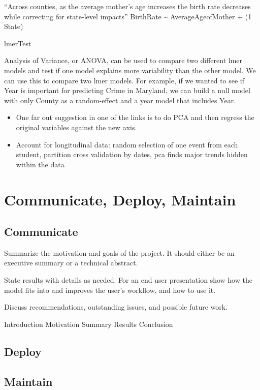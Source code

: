 \documentclass[]{book}
\begin{document}
``Across counties, as the average mother's age increases the birth rate
decreases while correcting for state-level impacts'' BirthRate
\textasciitilde{} AverageAgeofMother + (1 \textbar{} State)

lmerTest

Analysis of Variance, or ANOVA, can be used to compare two different
lmer models and test if one model explains more variability than the
other model. We can use this to compare two lmer models. For example, if
we wanted to see if Year is important for predicting Crime in Maryland,
we can build a null model with only County as a random-effect and a year
model that includes Year.

\begin{itemize}
\item
  One far out suggestion in one of the links is to do PCA and then
  regress the original variables against the new axis.
\item
  Account for longitudinal data: random selection of one event from each
  student, partition cross validation by dates, pca finds major trends
  hidden within the data
\end{itemize}

\chapter{Communicate, Deploy,
Maintain}\label{communicate-deploy-maintain}

\section{Communicate}\label{communicate-1}

Summarize the motivation and goals of the project. It should either be
an executive summary or a technical abstract.

State results with details as needed. For an end user presentation show
how the model fits into and improves the user's workflow, and how to use
it.

Discuss recommendations, outstanding issues, and possible future work.

Introduction \textbar{} Motivation \textbar{} Summary \textbar{} Results
\textbar{} Conclusion

\section{Deploy}\label{deploy}

\section{Maintain}\label{maintain}
\end{document}
